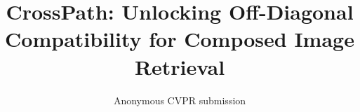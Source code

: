 \documentclass[10pt,twocolumn,letterpaper]{article}
\title{CrossPath: Unlocking Off-Diagonal Compatibility for Composed Image Retrieval}
\author{Anonymous CVPR submission}
\begin{document}
\maketitle





\FloatBarrier


{\small


}
\end{document}
